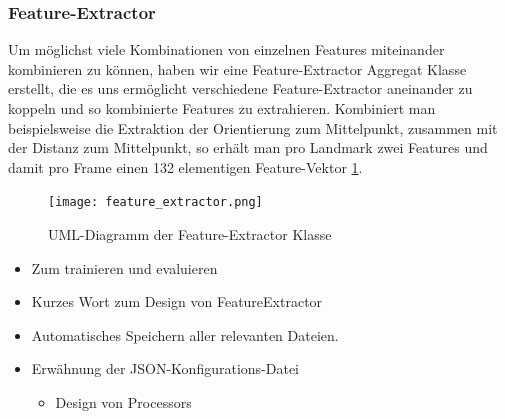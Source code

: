 \subsubsection{Feature-Extractor}
Um möglichst viele Kombinationen von einzelnen Features miteinander kombinieren zu können, haben wir eine Feature-Extractor Aggregat
Klasse erstellt, die es uns ermöglicht verschiedene Feature-Extractor aneinander zu koppeln und so kombinierte Features zu extrahieren.
Kombiniert man beispielsweise die Extraktion der Orientierung zum Mittelpunkt, zusammen mit der Distanz zum Mittelpunkt, so erhält man
pro Landmark zwei Features und damit pro Frame einen 132 elementigen Feature-Vektor \ref{Implementierung.Feature-Extractor}.\newline

\begin{figure}
\begin{center}
\texttt{[image: feature\_extractor.png]}
\caption{UML-Diagramm der Feature-Extractor Klasse}
\end{center}
\label{Implementierung.Feature-Extractor}
\end{figure}



\begin{itemize}
  \item Zum trainieren und evaluieren
  \item Kurzes Wort zum Design von FeatureExtractor
  \item Automatisches Speichern aller relevanten Dateien.
  \item Erwähnung der JSON-Konfigurations-Datei
    \begin{itemize}
    \item Design von Processors
  \end{itemize}
\end{itemize}
